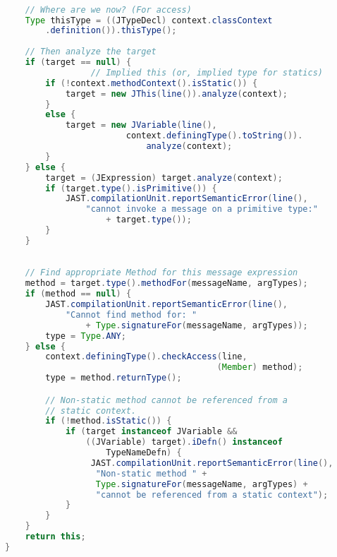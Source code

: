 \documentclass[8pt,a4paper,compress]{beamer}
\begin{document}
\begin{frame}[fragile]
\pause

\begin{lstlisting}[language=Java]

    // Where are we now? (For access)
    Type thisType = ((JTypeDecl) context.classContext
        .definition()).thisType();
        
    // Then analyze the target
    if (target == null) {
                 // Implied this (or, implied type for statics)
        if (!context.methodContext().isStatic()) {
            target = new JThis(line()).analyze(context);
        }
        else {
            target = new JVariable(line(),
                        context.definingType().toString()).
                            analyze(context);
        }
    } else {
        target = (JExpression) target.analyze(context);
        if (target.type().isPrimitive()) {
            JAST.compilationUnit.reportSemanticError(line(),
                "cannot invoke a message on a primitive type:"
                    + target.type());
        }
    }
\end{lstlisting}
\end{frame}

\begin{frame}[fragile]
\pause

\begin{lstlisting}[language=Java]

    // Find appropriate Method for this message expression
    method = target.type().methodFor(messageName, argTypes);
    if (method == null) {
        JAST.compilationUnit.reportSemanticError(line(),
            "Cannot find method for: "
                + Type.signatureFor(messageName, argTypes));
        type = Type.ANY;
    } else {
        context.definingType().checkAccess(line,
                                          (Member) method);
        type = method.returnType();

        // Non-static method cannot be referenced from a
        // static context.
        if (!method.isStatic()) {
            if (target instanceof JVariable &&
                ((JVariable) target).iDefn() instanceof
                    TypeNameDefn) {
                 JAST.compilationUnit.reportSemanticError(line(),
                  "Non-static method " +
                  Type.signatureFor(messageName, argTypes) +
                  "cannot be referenced from a static context");
            }
        }
    }
    return this;
}
\end{lstlisting}
\end{frame}
\end{document}
